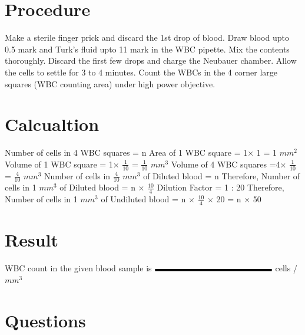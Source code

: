 \documentclass[a4paper,12pt]{book}
\begin{document}
	\section*{Procedure}

	Make a sterile finger prick and discard the 1st drop of blood. Draw blood upto 0.5 mark and Turk’s fluid upto 11 mark in the WBC pipette. Mix the contents thoroughly. Discard the first few drops and charge the Neubauer chamber. Allow the cells to settle for 3 to 4 minutes. Count the WBCs in the 4 corner large squares (WBC counting area) under high power objective.

	\section*{Calcualtion}

	Number of cells in 4 WBC squares = n\newline\vspace{.2cm}
	Area of 1 WBC square = 	1$\times$ 1 	= 1 $mm^2$\newline\vspace{.2cm}
	Volume of 1 WBC square	= 1$\times$ $\frac{1}{10}$ = $\frac{1}{10}$ $mm^3$\newline\vspace{.2cm}
	Volume of 4 WBC squares =4$\times$ $\frac{1}{10}$ = $\frac{4}{10}$ $mm^3$\newline\vspace{.2cm}
	Number of cells in $\frac{4}{10}$ $mm^3$ of Diluted blood 	= n \newline\vspace{.2cm}
	Therefore, Number of cells in 1 $mm^3$ of Diluted blood = 	n $\times$ $\frac{10}{4}$\newline\vspace{.2cm}
	Dilution Factor = 1 : 20\newline\vspace{.2cm}
	Therefore, Number of cells in 1 $mm^3$ of Undiluted blood 	= n $\times$ $\frac{10}{4}$ $\times$ 20 =	n $\times$ 50\newline\vspace{.2cm}


	\section *{Result}

WBC count in the given  blood sample is $\rule{5cm}{0.1cm}$ cells / $mm^3$

	\section*{Questions}
\end{document}
